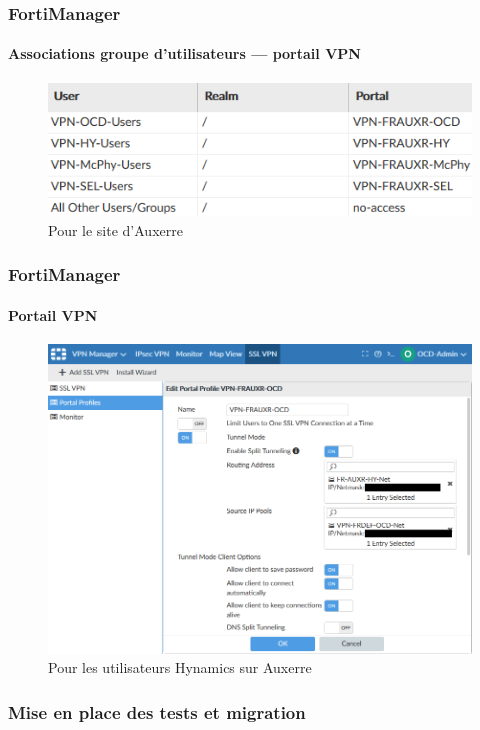 \documentclass[french, a4paper]{beamer}
\begin{document}
\begin{frame}
    \frametitle{FortiManager}
    \framesubtitle{Associations groupe d'utilisateurs --- portail VPN}
    \begin{figure}[h!]
        \centering
        \includegraphics[width = \linewidth]{img/fmg/ssl-mappings.png}
        \caption{Pour le site d'Auxerre}%
        \label{fig:fmg/ssl-mappings}
    \end{figure}
\end{frame}

\begin{frame}
    \frametitle{FortiManager}
    \framesubtitle{Portail VPN}
    \begin{figure}[h!]
        \centering
        \includegraphics[width = 0.8\linewidth]{img/fmg/ssl-portal.png}
        \caption{Pour les utilisateurs Hynamics sur Auxerre}%
        \label{fig:fmg/ssl-portal}
    \end{figure}
\end{frame}

\subsubsection{Mise en place des tests et migration}
\end{document}
